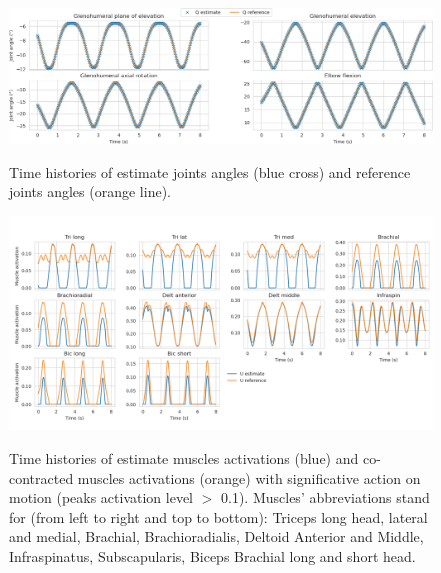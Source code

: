 \begin{figure}[t!] 
\centering 
\includegraphics[width=\textwidth]{figures/Articular_angle_MHE.png}\\ 
\caption{Time histories of estimate joints angles (blue cross) and reference joints angles (orange line).} 
\label{fig:joints_angles_MHE} 
\end{figure} 

\begin{figure}[t!] 
\centering 
\includegraphics[width=\textwidth]{figures/Muscles_excitations_MHE.png}\\ 
\caption{Time histories of estimate muscles activations (blue) and co-contracted muscles activations (orange) with significative action on motion (peaks activation level $>$ 0.1). 
Muscles' abbreviations stand for (from left to right and top to bottom): Triceps long head, lateral and medial, Brachial, Brachioradialis, Deltoid Anterior and Middle, Infraspinatus, Subscapularis, Biceps Brachial long and short head.} 
\label{fig:muscles_excitations_MHE} 
\end{figure} 

